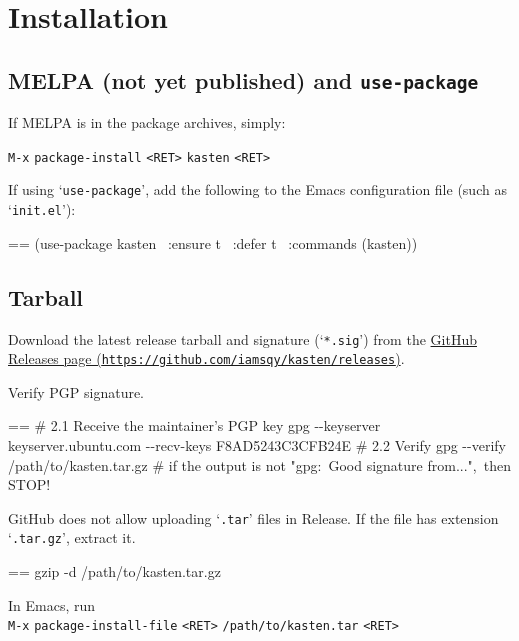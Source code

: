 \documentclass{book}
\makeatletter
\newenvironment{Texinfopreformatted}{%
  \par\GNUTobeylines\obeyspaces\frenchspacing\parskip=\z@\parindent=\z@}{}
{\catcode`\^^M=13 \gdef\GNUTobeylines{\catcode`\^^M=13 \def^^M{\null\par}}}
\newenvironment{Texinfoindented}{\begin{list}{}{}\item\relax}{\end{list}}
\renewcommand{\_}{\Texinfounderscore\discretionary{}{}{}}
\makeatother
\begin{document}
\chapter{{Installation}}
\label{anchor:Installation}%


\section{{MELPA (not yet published) and \texttt{use-package}}}
\label{anchor:MELPA-_0028not-yet-published_0029-and-use_002dpackage}%

If MELPA is in the package archives, simply:

\texttt{M-x} \texttt{package-install} \texttt{<RET>} \texttt{kasten} \texttt{<RET>}

If using `\texttt{use-package}', add the following to the Emacs configuration file (such
as `\texttt{init.el}'):

\begin{Texinfoindented}
\begin{Texinfopreformatted}%
\ttfamily (use-package kasten
\  :ensure t
\  :defer t
\  :commands (kasten))
\end{Texinfopreformatted}
\end{Texinfoindented}

\section{{Tarball}}
\label{anchor:Tarball}%

\begin{enumerate}[start=1]
\item Download the latest release tarball and signature (`\texttt{*.sig}') from the \href{https://github.com/iamsqy/kasten/releases}{GitHub
Releases page (\nolinkurl{https://github.com/iamsqy/kasten/releases})}.
\item Verify PGP signature.
\begin{Texinfoindented}
\begin{Texinfopreformatted}%
\ttfamily \# 2.1 Receive the maintainer's PGP key
gpg {-}{-}keyserver keyserver.ubuntu.com {-}{-}recv-keys F8AD5243C3CFB24E
\# 2.2 Verify
gpg {-}{-}verify /path/to/kasten.tar.gz
\# if the output is not "gpg:\ Good signature from...",\ then STOP!
\end{Texinfopreformatted}
\end{Texinfoindented}
\item GitHub does not allow uploading `\texttt{.tar}' files in Release. If the
file has extension `\texttt{.tar.gz}', extract it.
\begin{Texinfoindented}
\begin{Texinfopreformatted}%
\ttfamily gzip -d /path/to/kasten.tar.gz
\end{Texinfopreformatted}
\end{Texinfoindented}
\item In Emacs, run \leavevmode{}\\
\texttt{M-x} \texttt{package-install-file} \texttt{<RET>} \texttt{/path/to/kasten.tar} \texttt{<RET>}
\end{enumerate}
\end{document}
